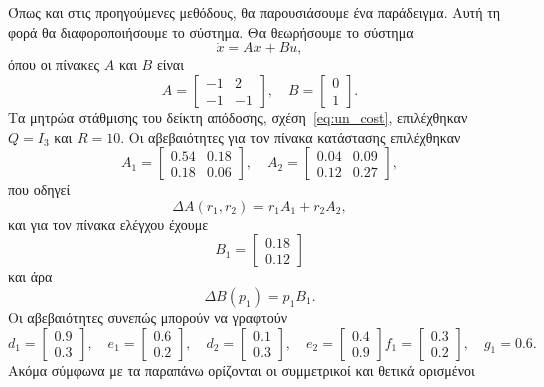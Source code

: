 Όπως και στις προηγούμενες μεθόδους, θα παρουσιάσουμε ένα παράδειγμα. Αυτή τη
φορά θα διαφοροποιήσουμε το σύστημα. Θα θεωρήσουμε το σύστημα
\[
    \dot{x} = Ax + Bu,
\]
όπου οι πίνακες \( A \) και \( B \) είναι
\[
    A =
    \begin{bmatrix}
        -1 & 2 \\
        -1 & -1
    \end{bmatrix}, \quad
    B = \begin{bmatrix}0 \\ 1\end{bmatrix}.
\]
Τα μητρώα στάθμισης του δείκτη απόδοσης, σχέση~\eqref{eq:un_cost}, επιλέχθηκαν
\( Q = I_3 \) και \( R = 10 \). Οι αβεβαιότητες για τον πίνακα κατάστασης
επιλέχθηκαν
\[
    A_1 =
    \begin{bmatrix}
        0.54 & 0.18 \\
        0.18 &  0.06
    \end{bmatrix},\quad
    A_2 =
    \begin{bmatrix}
        0.04 & 0.09 \\
        0.12 & 0.27
    \end{bmatrix},
\]
που οδηγεί
\[
    \Delta A(r_1, r_2) = r_1A_1 + r_2A_2,
\]
και για τον πίνακα ελέγχου έχουμε
\[
    B_1 =
    \begin{bmatrix}
        0.18 \\
        0.12
    \end{bmatrix}
\]
και άρα
\[
    \Delta B(p_1) = p_1B_1.
\]
Οι αβεβαιότητες συνεπώς μπορούν να γραφτούν
\[
    d_1 =
    \begin{bmatrix}
        0.9 \\ 0.3
    \end{bmatrix},\quad
    e_1 =
    \begin{bmatrix}
        0.6 \\ 0.2
    \end{bmatrix},\quad
    d_2 =
    \begin{bmatrix}
        0.1 \\ 0.3
    \end{bmatrix},\quad
    e_2 =
    \begin{bmatrix}
        0.4 \\ 0.9
    \end{bmatrix}
    f_1 =
    \begin{bmatrix}
        0.3 \\ 0.2
    \end{bmatrix},\quad
    g_1 = 0.6.
\]
Ακόμα σύμφωνα με τα παραπάνω ορίζονται οι συμμετρικοί και θετικά ορισμένοι
